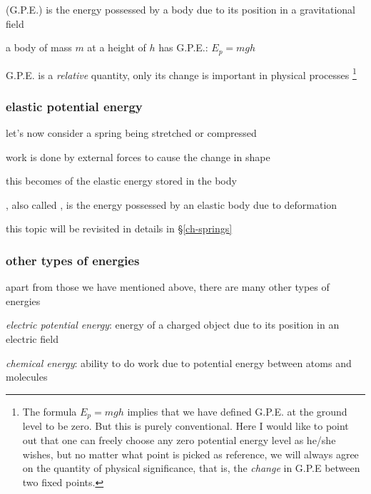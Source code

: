 \begin{ilight}
	 (G.P.E.) is the energy possessed by a body due to its position in a gravitational field
\end{ilight}

\cmt a body of mass $m$ at a height of $h$ has G.P.E.: $\boxed{E_p = mgh}$

\cmt G.P.E. is a \emph{relative} quantity, only its change is important in physical processes
\footnote{The formula $E_p = mgh$ implies that we have defined G.P.E. at the ground level to be zero. But this is purely conventional. Here I would like to point out that one can freely choose any zero potential energy level as he/she wishes, but no matter what point is picked as reference, we will always agree on the quantity of physical significance, that is, the \emph{change} in G.P.E between two fixed points.}






\subsubsection{elastic potential energy}

let's now consider a spring being stretched or compressed

work is done by external forces to cause the change in shape

this becomes of the elastic energy stored in the body

\begin{ilight}
	, also called , is the energy possessed by an elastic body due to deformation 
\end{ilight}

this topic will be revisited in details in \S\ref{ch-springs}

\subsubsection{other types of energies}

apart from those we have mentioned above, there are many other types of energies 

\titem \emph{electric potential energy}: energy of a charged object due to its position in an electric field

\titem \emph{chemical energy}: ability to do work due to potential energy between atoms and molecules

